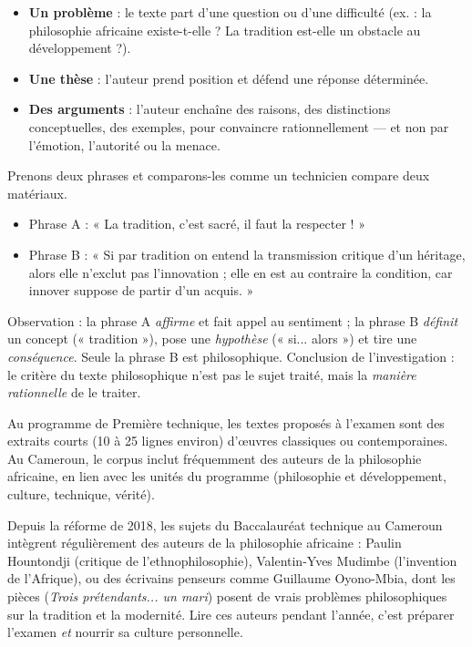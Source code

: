 \documentclass[11pt]{article}
\begin{document}
\begin{itemize}
\item \textbf{Un problème} : le texte part d'une question ou d'une difficulté (ex. : la philosophie africaine existe-t-elle ? La tradition est-elle un obstacle au développement ?).
\item \textbf{Une thèse} : l'auteur prend position et défend une réponse déterminée.
\item \textbf{Des arguments} : l'auteur enchaîne des raisons, des distinctions conceptuelles, des exemples, pour convaincre rationnellement — et non par l'émotion, l'autorité ou la menace.
\end{itemize}

\begin{exemplebox}
Prenons deux phrases et comparons-les comme un technicien compare deux matériaux.
\begin{itemize}
\item Phrase A : « La tradition, c'est sacré, il faut la respecter ! »
\item Phrase B : « Si par tradition on entend la transmission critique d'un héritage, alors elle n'exclut pas l'innovation ; elle en est au contraire la condition, car innover suppose de partir d'un acquis. »
\end{itemize}
Observation : la phrase A \emph{affirme} et fait appel au sentiment ; la phrase B \emph{définit} un concept (« tradition »), pose une \emph{hypothèse} (« si... alors ») et tire une \emph{conséquence}. Seule la phrase B est philosophique. Conclusion de l'investigation : le critère du texte philosophique n'est pas le sujet traité, mais la \emph{manière rationnelle} de le traiter.
\end{exemplebox}

Au programme de Première technique, les textes proposés à l'examen sont des extraits courts (10 à 25 lignes environ) d'œuvres classiques ou contemporaines. Au Cameroun, le corpus inclut fréquemment des auteurs de la philosophie africaine, en lien avec les unités du programme (philosophie et développement, culture, technique, vérité).

\begin{savaistu}
Depuis la réforme de 2018, les sujets du Baccalauréat technique au Cameroun intègrent régulièrement des auteurs de la philosophie africaine : Paulin Hountondji (critique de l'ethnophilosophie), Valentin-Yves Mudimbe (l'invention de l'Afrique), ou des écrivains penseurs comme Guillaume Oyono-Mbia, dont les pièces (\emph{Trois prétendants... un mari}) posent de vrais problèmes philosophiques sur la tradition et la modernité. Lire ces auteurs pendant l'année, c'est préparer l'examen \emph{et} nourrir sa culture personnelle.
\end{savaistu}
\end{document}
